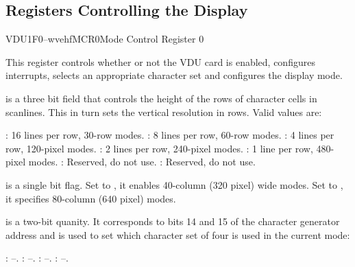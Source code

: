 \subsection{Registers Controlling the Display}

\begin{ioport}{VDU}{1F0}{--wvehf}{MCR0}{Mode Control Register 0}

  This register controls whether or not the VDU card is enabled, configures
  interrupts, selects an appropriate character set and configures the display
  mode.

  \begin{bitfield}
  \end{bitfield}

  \begin{description}
     is a three bit field that controls the height of the rows
    of character cells in scanlines. This in turn sets the vertical resolution
    in rows. Valid values are:
    
    \begin{description}
      : 16 lines per row, 30-row modes.
      : 8 lines per row, 60-row modes.
      : 4 lines per row, 120-pixel modes.
      : 2 lines per row, 240-pixel modes.
      : 1 line per row, 480-pixel modes.
      : Reserved, do not use.
      : Reserved, do not use.
    \end{description}
    
     is a single bit flag. Set to , it enables
    40-column (320 pixel) wide modes. Set to , it specifies 80-column
    (640 pixel) modes.
    
     is a two-bit quanity. It corresponds to bits 14 and 15
    of the character generator address and is used to set which character set
    of four is used in the current mode:
    
    \begin{description}
      : –.
      : –.
      : –.
      : –.
    \end{description}
    

\end{description}
\end{ioport}
